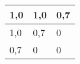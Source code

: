 \documentclass{bschlangaul-aufgabe}
\begin{document}
\begin{enumerate}
\begin{center}
\begin{tabular}{|l|l|l|}
\hline
1,0 & 1,0 & 0,7\\\hline
1,0 & 0,7 & 0\\\hline
0,7 & 0 & 0\\\hline
\end{tabular}
\end{center}

\begin{bAntwort}

\end{bAntwort}

\end{enumerate}
\end{document}
